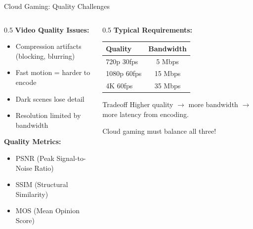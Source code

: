 \documentclass[aspectratio=169,12pt]{beamer}
\begin{document}
\begin{frame}{Cloud Gaming: Quality Challenges}
    \begin{columns}
        \begin{column}{0.5\textwidth}
            \textbf{Video Quality Issues:}
            \begin{itemize}
                \item Compression artifacts (blocking, blurring)
                \item Fast motion = harder to encode
                \item Dark scenes lose detail
                \item Resolution limited by bandwidth
            \end{itemize}
            
            \vspace{0.3cm}
            \textbf{Quality Metrics:}
            \begin{itemize}
                \item PSNR (Peak Signal-to-Noise Ratio)
                \item SSIM (Structural Similarity)
                \item MOS (Mean Opinion Score)
            \end{itemize}
        \end{column}
        \begin{column}{0.5\textwidth}
            \textbf{Typical Requirements:}
            \begin{center}
                \begin{tabular}{l|c}
                    \toprule
                    Quality & Bandwidth \\
                    \midrule
                    720p 30fps & 5 Mbps \\
                    1080p 60fps & 15 Mbps \\
                    4K 60fps & 35 Mbps \\
                    \bottomrule
                \end{tabular}
            \end{center}
            
            \vspace{0.3cm}
            \begin{alertblock}{Tradeoff}
                Higher quality $\rightarrow$ more bandwidth $\rightarrow$ more latency from encoding.
                
                Cloud gaming must balance all three!
            \end{alertblock}
        \end{column}
    \end{columns}
\end{frame}
\end{document}
